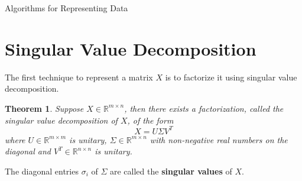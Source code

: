 \documentclass[12pt]{pom_thesis}
\newtheorem{theorem}{Theorem}
\begin{document}
\begin{chapter}{Algorithms for Representing Data}
	\label{chapter:techniques}
\section{Singular Value Decomposition}
\label{section:svd}
The first technique to represent a matrix $X$ is to factorize it using singular value decomposition. 

\begin{theorem}
	Suppose  $X \in \mathbb{R}^{m \times n}$, then there exists a factorization, called the singular value decomposition of $X$, of the form 
	$$X= U \Sigma V^T$$ 
	where $U \in \mathbb{R}^{m \times m}$ is unitary, $\Sigma \in \mathbb{R}^{m \times n}$ with non-negative real numbers on the diagonal and $V^T \in \mathbb{R}^{n \times n}$ is unitary. 
\end{theorem}
The diagonal entries $\sigma_i$ of $\Sigma$ are called the \textbf{singular values} of $X$.


\end{chapter}
\end{document}
